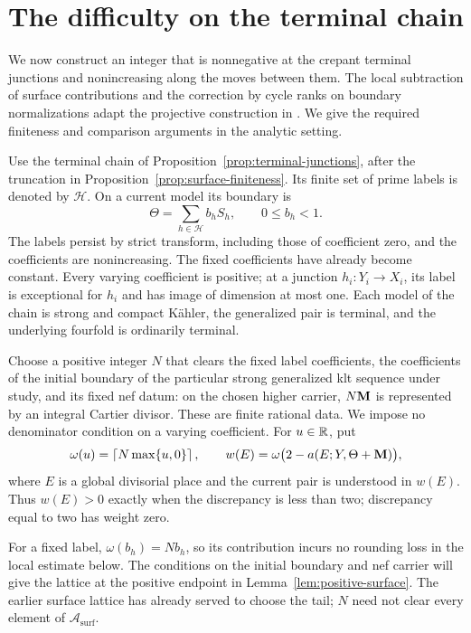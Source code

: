 \section{The difficulty on the terminal chain}\label{sec:difficulty}

We now construct an integer that is nonnegative at the crepant terminal
junctions and nonincreasing along the moves between them.  The local
subtraction of surface contributions and the correction by cycle ranks on
boundary normalizations adapt the projective construction in
\cite[Definition~4.2, Lemma~4.3, and Section~7]{ProjectiveLCFourfolds}.
We give the required finiteness and comparison arguments in the analytic
setting.

Use the terminal chain of Proposition~\ref{prop:terminal-junctions}, after
the truncation in Proposition~\ref{prop:surface-finiteness}.  Its finite set
of prime labels is denoted by \(\mathcal H\).  On a current model its
boundary is
\[
 \Theta=\sum_{h\in\mathcal H}b_hS_h,\qquad 0\leq b_h<1.
\]
The labels persist by strict transform, including those of coefficient
zero, and the coefficients are nonincreasing.  The fixed coefficients have
already become constant.  Every varying coefficient is positive; at a
junction \(h_i:Y_i\to X_i\), its label is exceptional for \(h_i\) and has
image of dimension at most one.  Each model of the chain is strong and
compact K\"ahler, the generalized pair is terminal, and the underlying
fourfold is ordinarily terminal.

Choose a positive integer \(N\) that clears the fixed label coefficients,
the coefficients of the initial boundary of the particular strong
generalized klt sequence under study, and its fixed nef datum: on the chosen
higher carrier, \(N\mathbf{M}\) is represented by an integral Cartier divisor.
These are finite rational data.  We impose no denominator condition on a
varying coefficient.  For \(u\in\mathbb{R}\), put
\begin{equation}\label{eq:difficulty-weights}
 \omega(u)=\left\lceil N\max\{u,0\}\right\rceil,
 \qquad
 w(E)=\omega\bigl(2-a(E;Y,\Theta+\mathbf{M})\bigr),
\end{equation}
where \(E\) is a global divisorial place and the current pair is understood
in \(w(E)\).  Thus \(w(E)>0\) exactly when the discrepancy is less than
two; discrepancy equal to two has weight zero.

For a fixed label, \(\omega(b_h)=Nb_h\), so its contribution incurs no
rounding loss in the local estimate below.  The conditions on the initial
boundary and nef carrier will give the lattice at the positive endpoint in
Lemma~\ref{lem:positive-surface}.  The earlier surface lattice has already
served to choose the tail; \(N\) need not clear every element of
\(\mathcal A_{\mathrm{surf}}\).


